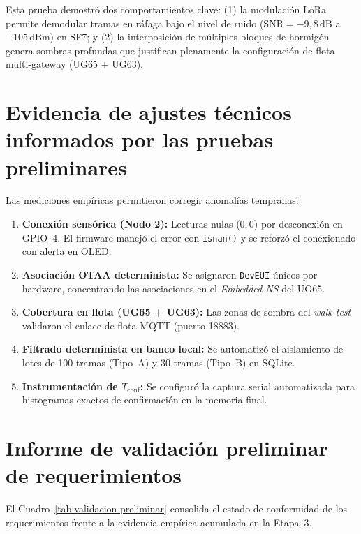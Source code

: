 \documentclass[12pt,oneside,openany,spanish,oldfontcommands]{memoir}
\begin{document}
Esta prueba demostró dos comportamientos clave: (1) la modulación LoRa permite demodular tramas en ráfaga bajo el nivel de ruido ($\text{SNR} = -9,8\,\text{dB}$ a $-105\,\text{dBm}$) en SF7; y (2) la interposición de múltiples bloques de hormigón genera sombras profundas que justifican plenamente la configuración de flota multi-gateway (UG65 + UG63).

\section{Evidencia de ajustes técnicos informados por las pruebas preliminares}\label{sec:ajustes-derivados}

Las mediciones empíricas permitieron corregir anomalías tempranas:
\begin{enumerate}
    \item \textbf{Conexión sensórica (Nodo 2):} Lecturas nulas ($0,0$) por desconexión en GPIO~4. El firmware manejó el error con \texttt{isnan()} y se reforzó el conexionado con alerta en OLED.
    \item \textbf{Asociación OTAA determinista:} Se asignaron \texttt{DevEUI} únicos por hardware, concentrando las asociaciones en el \textit{Embedded NS} del UG65.
    \item \textbf{Cobertura en flota (UG65 + UG63):} Las zonas de sombra del \textit{walk-test} validaron el enlace de flota MQTT (puerto 18883).
    \item \textbf{Filtrado determinista en banco local:} Se automatizó el aislamiento de lotes de 100 tramas (Tipo~A) y 30 tramas (Tipo~B) en SQLite.
    \item \textbf{Instrumentación de $T_{\mathrm{conf}}$:} Se configuró la captura serial automatizada para histogramas exactos de confirmación en la memoria final.
\end{enumerate}

\section{Informe de validación preliminar de requerimientos}\label{sec:validacion-preliminar}

El Cuadro~\ref{tab:validacion-preliminar} consolida el estado de conformidad de los requerimientos frente a la evidencia empírica acumulada en la Etapa~3.
\end{document}
